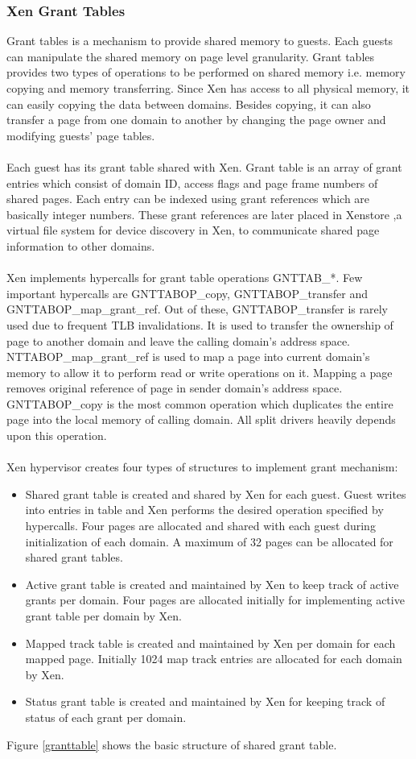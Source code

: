 \subsubsection{Xen Grant Tables\label{sec:granttables}}
Grant tables is a mechanism to provide shared memory to guests. Each guests can manipulate the shared memory on page level granularity. Grant tables provides two types of operations to be performed on shared memory i.e. memory copying and memory transferring. Since Xen has access to all physical memory, it can easily copying the data between domains. Besides copying, it can also transfer a page from one domain to another by changing the page owner and modifying guests' page tables. 
\\
\\
Each guest has its grant table shared with Xen. Grant table is an array of grant entries which consist of domain ID, access flags and page frame numbers of shared pages. Each entry can be indexed using grant references which are basically integer numbers. These grant references are later placed in Xenstore ,a virtual file system for device discovery in Xen, to communicate shared page information to other domains.
\\
\\
Xen implements hypercalls for grant table operations GNTTAB\_*. Few important hypercalls are GNTTABOP\_copy, GNTTABOP\_transfer and GNTTABOP\_map\_grant\_ref. Out of these, GNTTABOP\_transfer is rarely used due to frequent TLB invalidations. It is used to transfer the ownership of page to another domain and leave the calling domain's address space. NTTABOP\_map\_grant\_ref is used to map a page into current domain's memory to allow it to perform read or write operations on it. Mapping a page removes original reference of page in sender domain's address space. GNTTABOP\_copy is the most common operation which duplicates the entire page into the local memory of calling domain. All split drivers heavily depends upon this operation.
\\
\\
Xen hypervisor creates four types of structures to implement grant mechanism:
\begin{itemize}
	\item Shared grant table is created and shared by Xen for each guest. Guest writes into entries in table and Xen performs the desired operation specified by hypercalls. Four pages are allocated and shared with each guest during initialization of each domain. A maximum of 32 pages can be allocated for shared grant tables.
	\item Active grant table is created and maintained by Xen to keep track of active grants per domain. Four pages are allocated initially for implementing active grant table per domain by Xen.
	\item Mapped track table is created and maintained by Xen per domain for each mapped page. Initially 1024 map track entries are allocated for each domain by Xen.
	\item Status grant table is created and maintained by Xen for keeping track of status of each grant per domain.
\end{itemize}
Figure \ref{granttable} shows the basic structure of shared grant table.

